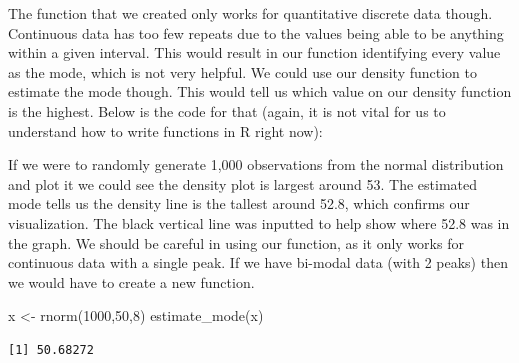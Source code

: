 \documentclass[
  letterpaper,
  DIV=11,
  numbers=noendperiod]{scrreprt}
\newenvironment{Shaded}{\begin{snugshade}}{\end{snugshade}}
\newcommand{\AttributeTok}[1]{\textcolor[rgb]{0.40,0.45,0.13}{#1}}
\newcommand{\ConstantTok}[1]{\textcolor[rgb]{0.56,0.35,0.01}{#1}}
\newcommand{\ControlFlowTok}[1]{\textcolor[rgb]{0.00,0.23,0.31}{\textbf{#1}}}
\newcommand{\DecValTok}[1]{\textcolor[rgb]{0.68,0.00,0.00}{#1}}
\newcommand{\FunctionTok}[1]{\textcolor[rgb]{0.28,0.35,0.67}{#1}}
\newcommand{\NormalTok}[1]{\textcolor[rgb]{0.00,0.23,0.31}{#1}}
\newcommand{\OtherTok}[1]{\textcolor[rgb]{0.00,0.23,0.31}{#1}}
\newcommand{\SpecialCharTok}[1]{\textcolor[rgb]{0.37,0.37,0.37}{#1}}
\begin{document}
The function that we created only works for quantitative discrete data
though. Continuous data has too few repeats due to the values being able
to be anything within a given interval. This would result in our
function identifying every value as the mode, which is not very helpful.
We could use our density function to estimate the mode though. This
would tell us which value on our density function is the highest. Below
is the code for that (again, it is not vital for us to understand how to
write functions in R right now):

\begin{Shaded}
\end{Shaded}

If we were to randomly generate 1,000 observations from the normal
distribution and plot it we could see the density plot is largest around
53. The estimated mode tells us the density line is the tallest around
52.8, which confirms our visualization. The black vertical line was
inputted to help show where 52.8 was in the graph. We should be careful
in using our function, as it only works for continuous data with a
single peak. If we have bi-modal data (with 2 peaks) then we would have
to create a new function.

\begin{Shaded}
\begin{Highlighting}[]
\NormalTok{x }\OtherTok{\textless{}{-}} \FunctionTok{rnorm}\NormalTok{(}\DecValTok{1000}\NormalTok{,}\DecValTok{50}\NormalTok{,}\DecValTok{8}\NormalTok{)}
\FunctionTok{estimate\_mode}\NormalTok{(x)}
\end{Highlighting}
\end{Shaded}

\begin{verbatim}
[1] 50.68272
\end{verbatim}
\end{document}
